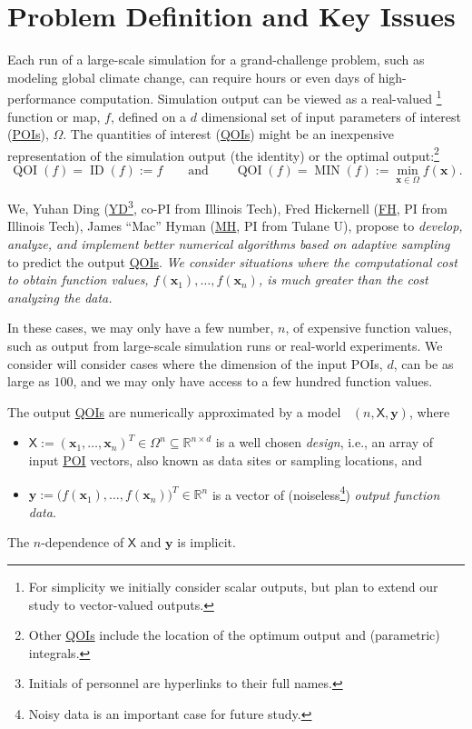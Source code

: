 \documentclass[11pt]{NSFamsart}
\newcommand{\FH}{\hyperlink{FHlink}{FH}\xspace}
\newcommand{\MH}{\hyperlink{MHlink}{MH}\xspace}
\newcommand{\YD}{\hyperlink{YDlink}{YD}\xspace}
\newcommand{\QOIs}{\hyperlink{QOIlink}{QOIs}\xspace}
\newcommand{\POIs}{\hyperlink{POIlink}{POIs}\xspace}
\DeclareMathOperator{\QOI}{QOI} %
\DeclareMathOperator{\APP}{\widehat{\QOI}}
\DeclareMathOperator{\MIN}{MIN}
\DeclareMathOperator{\ID}{ID}
\newcommand{\reals}{{\mathbb{R}}}
\newcommand{\mX}{\mathsf{X}}
\newcommand{\bx}{{\boldsymbol{x}}}
\newcommand{\by}{{\boldsymbol{y}}}
\begin{document}
\section{Problem Definition and Key Issues} \label{sec:defineProb}
Each run of a large-scale simulation for a grand-challenge problem, such as modeling global climate change, can require hours or even days of high-performance computation. Simulation output can be viewed as a real-valued%
\footnote{For simplicity we initially consider scalar outputs, but plan to extend our study to vector-valued outputs.}  
function or map, $f$, defined on a $d$ dimensional set of input \hypertarget{POIlink}{parameters of interest} (\POIs), $\Omega$. 
The \hypertarget{QOIlink}{quantities of interest} (\QOIs) might be an inexpensive representation of the simulation output (the identity) or the optimal output:\footnote{Other \QOIs include the location of the optimum output and (parametric) integrals.} 
\begin{equation} \label{eq:ourQOIs}
\QOI(f) = \ID(f) := f \qquad \text{and} \qquad \QOI(f) = \MIN(f) := \min_{\bx \in \Omega} f(\bx).
\end{equation}

We, \hypertarget{YDlink}{Yuhan Ding} (\YD\footnote{Initials of personnel are hyperlinks to their full names.}, co-PI from Illinois Tech), \hypertarget{FHlink}{Fred Hickernell} (\FH, PI from Illinois Tech), \hypertarget{MHlink}{James ``Mac'' Hyman} (\MH, PI from Tulane U),  propose to \emph{develop, analyze, and implement better numerical algorithms based on adaptive sampling} to predict the output \QOIs.
\emph{We consider situations where the  computational cost to obtain function values, $f(\bx_1), \ldots, f(\bx_n)$, is much greater than the cost analyzing the data.}  

In these cases, we may only have a few number, $n$, of expensive function values, such as output from large-scale simulation runs or real-world experiments. 
We consider will consider cases where the dimension of the input POIs, $d$, can be as large as $100$, and we may only have access to a few hundred function values. 

The output \QOIs are numerically approximated by a model $\APP(n,\mX,\by)$, where 
\begin{itemize}
\item $\mX := (\bx_1, \ldots, \bx_n)^T \in \Omega^{n} \subseteq \reals^{n \times d}$ is a well chosen \emph{design}, i.e., an array of input \hyperlink{POIlink}{POI\xspace} vectors, also known as data sites or sampling locations, and
\item $\by := \bigl(f(\bx_1), \ldots, f(\bx_n) \bigr)^T \in \reals^n$ is a vector of (noiseless\footnote{Noisy data is an important case for future study.}) \emph{output function data}.
\end{itemize} 
The $n$-dependence of $\mX$ and $\by$ is implicit. 
\end{document}
